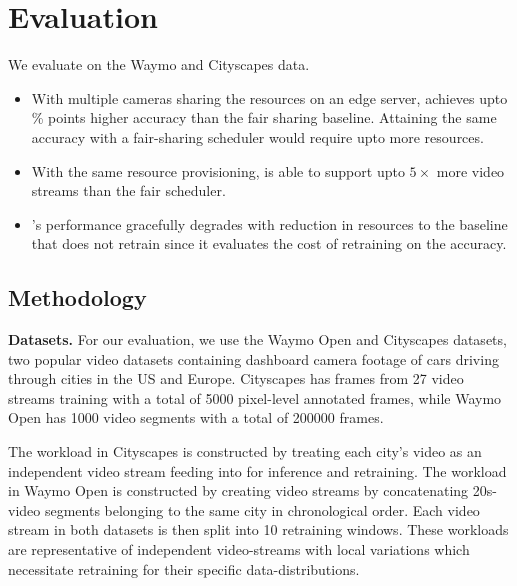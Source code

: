 \section{Evaluation}
\label{sec:evaluation}

We evaluate \name{} on the Waymo and Cityscapes data. %

\begin{itemize}
    \item With multiple cameras sharing the resources on an edge server, \name{} achieves upto \%  points higher accuracy than the fair sharing baseline. Attaining the same accuracy with a fair-sharing scheduler would require upto  more resources.
    \item With the same resource provisioning, \name{} is able to support upto $5\times$ more video streams than the fair scheduler.
    \item \name{}'s performance gracefully degrades with reduction in resources to the baseline that does not retrain since it evaluates the cost of retraining on the accuracy. 
\end{itemize}

\subsection{Methodology}
\label{subsec:eval-setup}


\noindent\textbf{Datasets.} For our evaluation, we use the Waymo Open\cite{waymo} and Cityscapes\cite{cityscapes} datasets, two popular video datasets containing dashboard camera footage of cars driving through cities in the US and Europe. Cityscapes has frames from 27 video streams training with a total of 5000 pixel-level annotated frames, while Waymo Open has 1000 video segments with a total of 200000 frames.

The workload in Cityscapes is constructed by treating each city's video as an independent video stream feeding into {\name} for inference and retraining. The workload in Waymo Open is constructed by creating video streams by concatenating 20s-video segments belonging to the same city in chronological order. Each video stream in both datasets is then split into 10 retraining windows. These workloads are representative of independent video-streams with local variations which necessitate retraining for their specific data-distributions.



